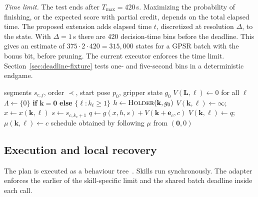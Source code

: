 \documentclass[conference]{IEEEtran}
\newcommand{\todo}[1]{}
\newcommand{\todo}[1]{\textcolor{red}{[TODO: #1]}}
\newcommand{\pre}{\prec}
\begin{document}
\emph{Time limit.} The test ends after $T_{\max}=420$\,s. Maximizing the
probability of finishing, or the expected score with partial credit,
depends on the total elapsed time. The proposed extension adds elapsed
time $t$, discretized at resolution $\Delta$, to the state. With
$\Delta=1$\,s there are 420 decision-time bins before the deadline.
This gives an estimate of $375\cdot2\cdot420=315{,}000$ states for a
GPSR batch with the bonus bit, before pruning. The current executor
enforces the time limit.
Section~\ref{sec:deadline-fixture} tests one- and five-second bins in a deterministic endgame.
\todo{Measure solve time on the robot.}

\begin{algorithm}[t]
\caption{Interleaving by progress-vector DP}\label{alg:dp}
\begin{algorithmic}[1]
\Require segments $s_{c,j}$, order $\pre$, start pose $p_0$, gripper state $g_0$
\State $V(\mathbf{L},\ell)\gets 0$ for all $\ell$ 
  \State $\Lambda\gets\{0\}$ \textbf{if} $\mathbf{k}=\mathbf{0}$ \textbf{else} $\{\ell: k_\ell\ge1\}$
  \State $h\gets\textsc{Holder}(\mathbf{k},g_0)$
  \For{$\ell\in\Lambda$}
    \State $V(\mathbf{k},\ell)\gets\infty$;\; $x\gets x(\mathbf{k},\ell)$
      \State $s\gets s_{c,k_c+1}$
        \State $q\gets g(x,h,s)+V(\mathbf{k}+\mathbf{e}_c,c)$
          \State $V(\mathbf{k},\ell)\gets q$;\; $\mu(\mathbf{k},\ell)\gets c$
        \EndIf
      \EndIf
    \EndFor
  \EndFor
\EndFor
\State \Return schedule obtained by following $\mu$ from $(\mathbf{0},0)$
\end{algorithmic}
\end{algorithm}

\subsection{Execution and local recovery}\label{sec:execution}
The plan is executed as a behaviour tree~\todo{cite py\_trees}. Skills run
synchronously. The adapter enforces the earlier of the skill-specific limit
and the shared batch deadline inside each call.
\todo{Implement non-blocking leaves.}
\end{document}
